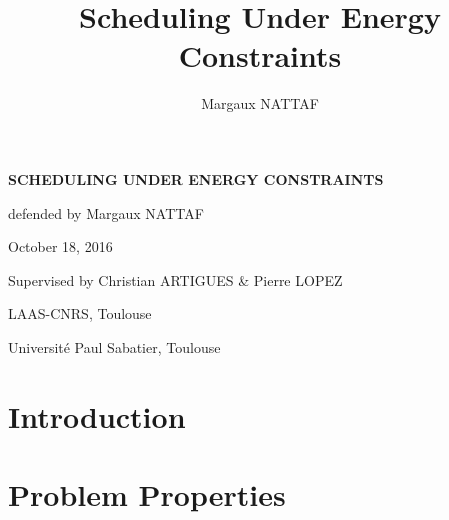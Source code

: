 \documentclass{beamer}
\title{Scheduling Under Energy Constraints}
\author{Margaux NATTAF}
\institute{LAAS-CNRS Toulouse

  Université Paul Sabatier Toulouse}
\begin{document}
{\canvasspecial
  \begin{frame}
    \vspace{1.5cm}
    \begin{flushleft}
      {\Large \bf \color{bleuLAAS}SCHEDULING UNDER ENERGY CONSTRAINTS}
      
      \vspace{0.3cm}
      \small \color{bleuLAAS!90} defended by Margaux NATTAF

      October 18, 2016
    \end{flushleft}
    \vspace{0.5cm}

    {\footnotesize  \color{bleuLAAS!80}
      Supervised by Christian ARTIGUES \& Pierre LOPEZ}

    \vspace{1.5cm}
    \begin{flushright} \color{bleuLAAS!70}
      \scriptsize LAAS-CNRS, Toulouse

      Université Paul Sabatier, Toulouse
    \end{flushright}
  \end{frame}}

\setcounter{framenumber}{0}

\section{Introduction}




\setcounter{tocdepth}{2}
\setcounter{tocdepth}{2}
\section{Problem Properties}

\end{document}
